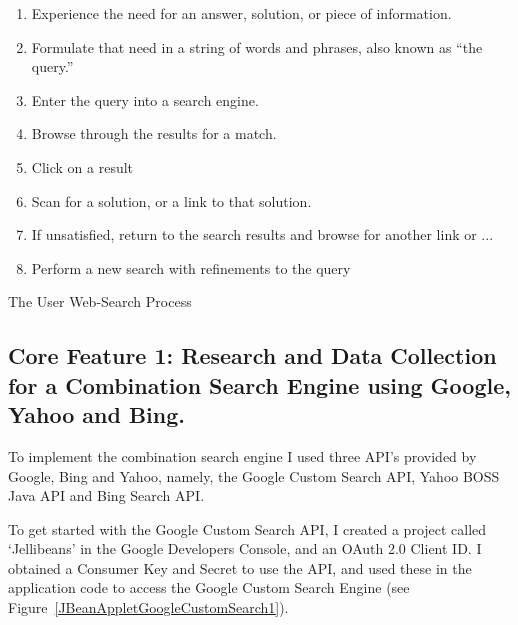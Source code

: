 \documentclass[a4paper, 11pt]{article}
\begin{document}
\begin{center}
\begin{enumerate}
\item{Experience the need for an answer,
solution, or piece of information.}
\item{Formulate that need in a string of words and phrases, also known as “the query.”}
\item{Enter the query into a search engine.}
\item{Browse through the results for a match.}
\item{Click on a result}
\item{Scan for a solution, or a link to that solution.}
\item{If unsatisfied, return to the search results and browse for another link or ...}
\item{Perform a new search with refinements to the query}
\label{search flows}
\end {enumerate}

\hspace{1.5cm}
The User Web-Search Process \cite{seo}

\end{center}

\subsection{Core Feature 1: Research and Data Collection for a Combination Search Engine using Google, Yahoo and Bing.}

To implement the combination search engine I used three API’s provided by Google, Bing and Yahoo, namely, the Google Custom Search API, Yahoo BOSS Java API and Bing Search API. 

To get started with the Google Custom Search API, I created a project called ‘Jellibeans’ in the Google Developers Console, and an OAuth 2.0 Client ID. I obtained a Consumer Key and Secret to use the API, and used these in the application code to access the Google Custom Search Engine (see Figure~\ref{JBeanAppletGoogleCustomSearch1}). 
\end{document}
